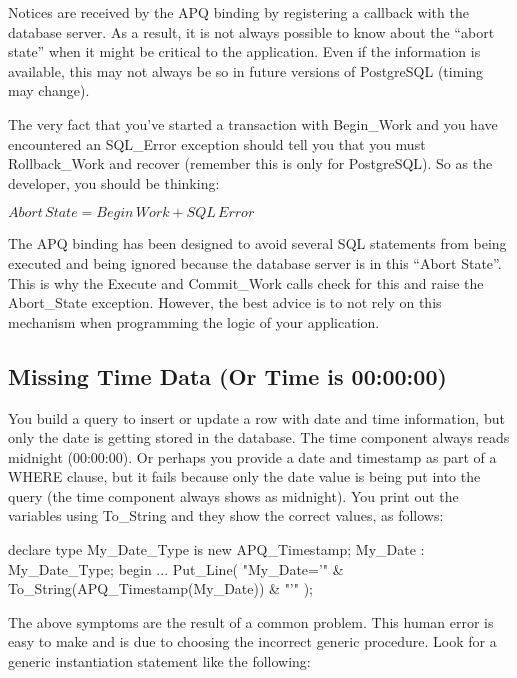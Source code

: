 \documentclass[english,letterpaper]{book}
\begin{document}
Notices are received by the APQ binding by registering a callback
with the database server. As a result, it is not always possible to
know about the ``abort state'' when it might be critical to the
application. Even if the information is available, this may not always
be so in future versions of PostgreSQL (timing may change).

The very fact that you've started a transaction with Begin\_Work and
you have encountered an SQL\_Error exception should tell you that
you must Rollback\_Work and recover (remember this is only for PostgreSQL).
So as the developer, you should be thinking:

$Abort\, State=Begin\, Work+SQL\, Error$

The APQ binding has been designed to avoid several SQL statements
from being executed and being ignored because the database server
is in this ``Abort State''. This is why the Execute and Commit\_Work
calls check for this and raise the Abort\_State exception. However,
the best advice is to not rely on this mechanism when programming
the logic of your application.


\subsection{Missing Time Data (Or Time is 00:00:00)}

You build a query to insert or update a row with date and time information,
but only the date is getting stored in the database. The time component
always reads midnight (00:00:00). Or perhaps you provide a date and
timestamp as part of a WHERE clause, but it fails because only the
date value is being put into the query (the time component always
shows as midnight). You print out the variables using To\_String and
they show the correct values, as follows:

\begin{Example}
declare
   type My_Date_Type is new APQ_Timestamp;
   My_Date : My_Date_Type;
begin
   ...
   Put_Line(
      "My_Date='"
      & To_String(APQ_Timestamp(My_Date))
      & "'"
   );
\end{Example}

The above symptoms are the result of a common problem. This human
error is easy to make and is due to choosing the incorrect generic
procedure. Look for a generic instantiation statement like the following:
\end{document}
